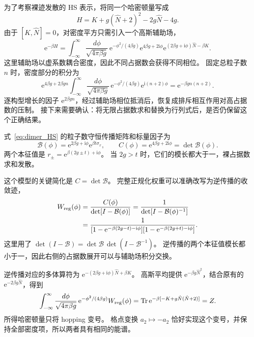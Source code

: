 \documentclass[UTF8,11pt,a4paper,fontset=fandol]{ctexart}
\newcommand{\Tr}{\operatorname{Tr}}
\newcommand{\ee}{\mathrm e}
\newcommand{\ii}{\mathrm i}
\numberwithin{equation}{section}
\begin{document}
为了考察裸迹发散的 HS 表示，将同一个哈密顿量写成
\begin{equation}
 H=K+g(\hat N+2)^2-2g\hat N-4g.
\end{equation}
由于 $[K,\hat N]=0$，对密度平方只需引入一个高斯辅助场，
\begin{equation}
 \ee^{-\beta H}
 =\int_{-\infty}^{\infty}\frac{d\phi}{\sqrt{4\pi\beta g}}\,
   \ee^{-\phi^2/(4\beta g)}
   \ee^{4\beta g+2\ii\phi}
   \ee^{(2\beta g+\ii\phi)\hat N-\beta K}.
 \label{eq:dimer_HS}
\end{equation}
这里辅助场以虚系数耦合密度，因此不同占据数会获得不同相位。
固定总粒子数 $n$ 时，密度部分的积分为
\begin{equation}
 \ee^{4\beta g+2\beta gn}
 \int_{-\infty}^{\infty}\frac{d\phi}{\sqrt{4\pi\beta g}}\,
 \ee^{-\phi^2/(4\beta g)}\ee^{\ii(n+2)\phi}
 =\ee^{-\beta g n(n+2)}.
 \label{eq:dimer_density_average}
\end{equation}
逐构型增长的因子 $\ee^{2\beta gn}$，经过辅助场相位抵消后，恢复成排斥相互作用对高占据数的压制。
接下来需要确认：将无限占据数求和替换为行列式后，是否仍保留这个正确结果。

式~\eqref{eq:dimer_HS} 的粒子数守恒传播矩阵和标量因子为
\begin{equation}
 \mathcal B(\phi)=\ee^{2\beta g+\ii\phi}\ee^{\beta t\sigma_x},
 \qquad C(\phi)=\ee^{4\beta g+2\ii\phi}
              =\det\mathcal B(\phi).
 \label{eq:dimer_B}
\end{equation}
两个本征值是
$r_\pm=\ee^{\beta(2g\pm t)+\ii\phi}$。
当 $2g>t$ 时，它们的模长都大于一，裸占据数求和发散。

这个模型的关键简化是 $C=\det\mathcal B$。
完整正规化权重可以准确改写为逆传播的收敛迹，
\begin{align}
 W_{\rm reg}(\phi)
 &=\frac{C(\phi)}{\det[I-\mathcal B(\phi)]}
 =\frac1{\det[I-\mathcal B(\phi)^{-1}]}\nonumber\\
 &=\frac1{
 [1-\ee^{-\beta(2g-t)-\ii\phi}]
 [1-\ee^{-\beta(2g+t)-\ii\phi}]}.
 \label{eq:dimer_inverse}
\end{align}
这里用了
$\det(I-\mathcal B)=\det\mathcal B\,\det(I-\mathcal B^{-1})$。
逆传播的两个本征值模长都小于一，因此右侧的占据数展开可以与辅助场积分交换。

逆传播对应的多体算符为
$\ee^{-(2\beta g+\ii\phi)\hat N+\beta K}$。
高斯平均提供 $\ee^{-\beta g\hat N^2}$，结合原有的
$\ee^{-2\beta g\hat N}$，得到
\begin{equation}
 \int_{-\infty}^{\infty}\frac{d\phi}{\sqrt{4\pi\beta g}}\,
 \ee^{-\phi^2/(4\beta g)}W_{\rm reg}(\phi)
 =\Tr\ee^{-\beta[-K+g\hat N(\hat N+2)]}
 =Z.
 \label{eq:dimer_exact_real}
\end{equation}
所得哈密顿量只将 hopping 变号。
格点变换 $a_2\mapsto-a_2$ 恰好实现这个变号，并保持全部密度项，所以两者具有相同的能谱。
\end{document}
